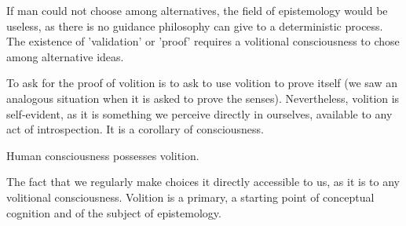         If man could not choose among alternatives, the field of epistemology would be useless, as there is no guidance philosophy can give to a deterministic process. The existence of 'validation' or 'proof' requires a volitional consciousness to chose among alternative ideas.
        
        To ask for the proof of volition is to ask to use volition to prove itself (we saw an analogous situation when it is asked to prove the senses). Nevertheless, volition is self-evident, as it is something we perceive directly in ourselves, available to any act of introspection. It is a corollary of consciousness.

            \begin{corollary}[Volition]
                Human consciousness possesses volition.
            \end{corollary}

        The fact that we regularly make choices it directly accessible to us, as it is to any volitional consciousness. Volition is a primary, a starting point of conceptual cognition and of the subject of epistemology.

